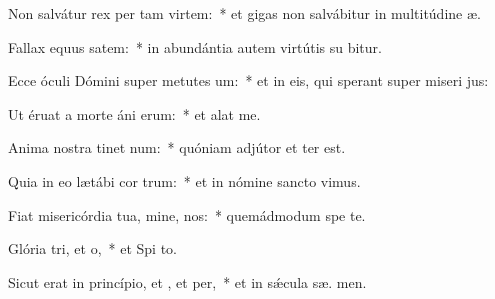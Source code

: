\item Non salvátur rex per tam virtem:~* et gigas non salvábitur in multitúdine  æ.
\item Fallax equus  satem:~* in abundántia autem virtútis su  bitur.
\item Ecce óculi Dómini super metutes um:~* et in eis, qui sperant super miseri jus:
\item Ut éruat a morte áni erum:~* et alat   me.
\item Anima nostra tinet num:~* quóniam adjútor et  ter est.
\item Quia in eo lætábi cor trum:~* et in nómine sancto  vimus.
\item Fiat misericórdia tua, mine,  nos:~* quemádmodum spe  te.
\item Glória tri, et o,~* et Spi to.
\item Sicut erat in princípio, et , et per,~* et in sǽcula sæ. men.
